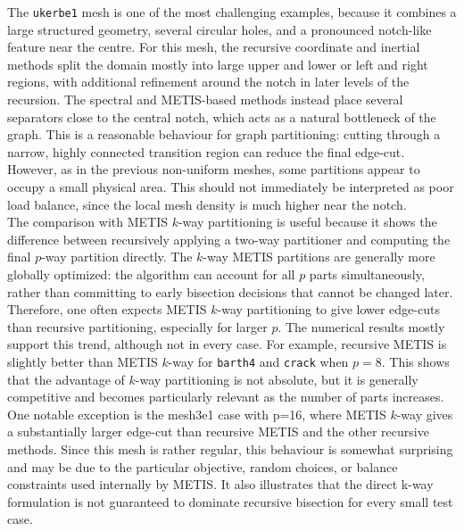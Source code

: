 \documentclass[unicode,10pt,a4paper,oneside,numbers=endperiod,openany]{scrartcl}
\begin{document}
The \texttt{ukerbe1} mesh is one of the most challenging examples, because it combines a large
structured geometry, several circular holes, and a pronounced notch-like feature near the centre.
For this mesh, the recursive coordinate and inertial methods split the domain mostly into large
upper and lower or left and right regions, with additional refinement around the notch in later
levels of the recursion. The spectral and METIS-based methods instead place several separators
close to the central notch, which acts as a natural bottleneck of the graph. This is a reasonable
behaviour for graph partitioning: cutting through a narrow, highly connected transition region can
reduce the final edge-cut. However, as in the previous non-uniform meshes, some partitions appear
to occupy a small physical area. This should not immediately be interpreted as poor load balance,
since the local mesh density is much higher near the notch.\\

The comparison with METIS \(k\)-way partitioning is useful because it shows the difference between
recursively applying a two-way partitioner and computing the final \(p\)-way partition directly.
The \(k\)-way METIS partitions are generally more globally optimized: the algorithm can account for
all \(p\) parts simultaneously, rather than committing to early bisection decisions that cannot be
changed later. Therefore, one often expects METIS \(k\)-way partitioning to give lower edge-cuts than
recursive partitioning, especially for larger \(p\). The numerical results mostly support this trend,
although not in every case. For example, recursive METIS is slightly better than METIS \(k\)-way for
\texttt{barth4} and \texttt{crack} when \(p=8\). This shows that the advantage of \(k\)-way partitioning
is not absolute, but it is generally competitive and becomes particularly relevant as the number of
parts increases.\\
One notable exception is the mesh3e1 case with p=16, where METIS \(k\)-way gives a substantially larger edge-cut than recursive METIS and the other recursive methods. Since this mesh is rather regular, this behaviour is somewhat surprising and may be due to the particular objective, random choices, or balance constraints used internally by METIS. It also illustrates that the direct k-way formulation is not guaranteed to dominate recursive bisection for every small test case.
\end{document}
